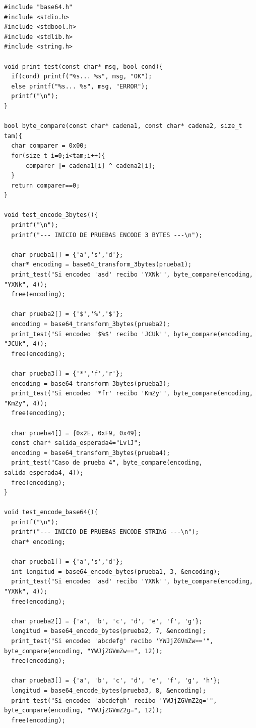 \documentclass[11pt]{article}
\begin{document}
    \begin{lstlisting}[style=Cstyle]
#include "base64.h"
#include <stdio.h>
#include <stdbool.h>
#include <stdlib.h>
#include <string.h>

void print_test(const char* msg, bool cond){
  if(cond) printf("%s... %s", msg, "OK");
  else printf("%s... %s", msg, "ERROR");
  printf("\n");
}

bool byte_compare(const char* cadena1, const char* cadena2, size_t tam){
  char comparer = 0x00;
  for(size_t i=0;i<tam;i++){
      comparer |= cadena1[i] ^ cadena2[i];
  }
  return comparer==0;
}

void test_encode_3bytes(){
  printf("\n");
  printf("--- INICIO DE PRUEBAS ENCODE 3 BYTES ---\n");

  char prueba1[] = {'a','s','d'};
  char* encoding = base64_transform_3bytes(prueba1);
  print_test("Si encodeo 'asd' recibo 'YXNk'", byte_compare(encoding, "YXNk", 4));
  free(encoding);

  char prueba2[] = {'$','%','$'};
  encoding = base64_transform_3bytes(prueba2);
  print_test("Si encodeo '$%$' recibo 'JCUk'", byte_compare(encoding, "JCUk", 4));
  free(encoding);

  char prueba3[] = {'*','f','r'};
  encoding = base64_transform_3bytes(prueba3);
  print_test("Si encodeo '*fr' recibo 'KmZy'", byte_compare(encoding, "KmZy", 4));
  free(encoding);

  char prueba4[] = {0x2E, 0xF9, 0x49};
  const char* salida_esperada4="LvlJ";
  encoding = base64_transform_3bytes(prueba4);
  print_test("Caso de prueba 4", byte_compare(encoding, salida_esperada4, 4));
  free(encoding);
}

void test_encode_base64(){
  printf("\n");
  printf("--- INICIO DE PRUEBAS ENCODE STRING ---\n");
  char* encoding;

  char prueba1[] = {'a','s','d'};
  int longitud = base64_encode_bytes(prueba1, 3, &encoding);
  print_test("Si encodeo 'asd' recibo 'YXNk'", byte_compare(encoding, "YXNk", 4));
  free(encoding);

  char prueba2[] = {'a', 'b', 'c', 'd', 'e', 'f', 'g'};
  longitud = base64_encode_bytes(prueba2, 7, &encoding);
  print_test("Si encodeo 'abcdefg' recibo 'YWJjZGVmZw=='", byte_compare(encoding, "YWJjZGVmZw==", 12));
  free(encoding);

  char prueba3[] = {'a', 'b', 'c', 'd', 'e', 'f', 'g', 'h'};
  longitud = base64_encode_bytes(prueba3, 8, &encoding);
  print_test("Si encodeo 'abcdefgh' recibo 'YWJjZGVmZ2g='", byte_compare(encoding, "YWJjZGVmZ2g=", 12));
  free(encoding);


\end{lstlisting}
\end{document}
